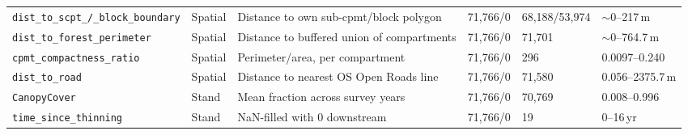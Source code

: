 \documentclass[logo,msc,ai]{infthesis}           %
\begin{document}
{\begin{longtable}{p{2.3cm}p{1.6cm}p{3.0cm}p{1.3cm}p{1.1cm}p{2.3cm}}
\texttt{dist\_to\_scpt\_/\_block\_boundary} & Spatial & Distance to own sub-cpmt/block polygon & 71{,}766/0 & 68{,}188/53{,}974 & $\sim$0--217\,m \\
\texttt{dist\_to\_forest\_perimeter} & Spatial & Distance to buffered union of compartments & 71{,}766/0 & 71{,}701 & $\sim$0--764.7\,m \\
\texttt{cpmt\_compactness\_ratio} & Spatial & Perimeter/area, per compartment & 71{,}766/0 & 296 & 0.0097--0.240 \\
\texttt{dist\_to\_road} & Spatial & Distance to nearest OS Open Roads line & 71{,}766/0 & 71{,}580 & 0.056--2375.7\,m \\
\texttt{CanopyCover} & Stand & Mean fraction across survey years & 71{,}766/0 & 70{,}769 & 0.008--0.996 \\
\texttt{time\_since\_thinning} & Stand & NaN-filled with 0 downstream & 71{,}766/0 & 19 & 0--16\,yr \\
\end{longtable}
}
\end{document}
